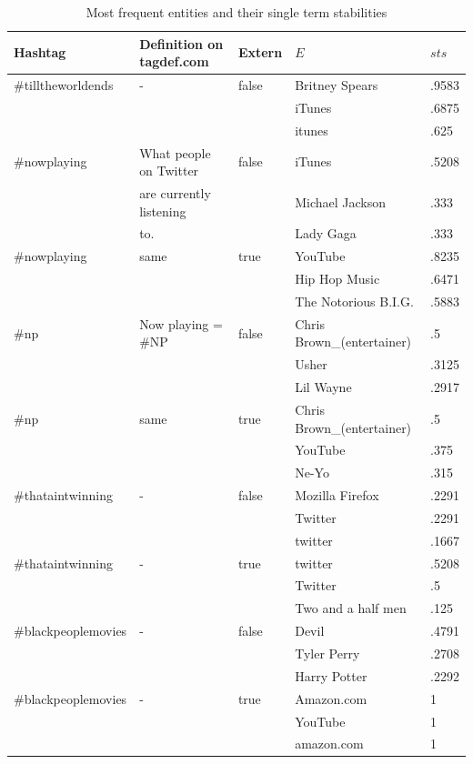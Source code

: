 \documentclass{llncs}
\begin{document}
\begin{table}[ht]
\centering
\small
\begin{tabular}{l|l|l|l|l}
Hashtag & Definition on tagdef.com & Extern & $E$ & $sts$ \\%
\hline
\#tilltheworldends & - & false & Britney Spears & .9583 \\
& & &  iTunes & .6875 \\
& & &  itunes & .625 \\ 
\hline
\#nowplaying & What people on Twitter & false & iTunes & .5208 \\
             & are currently listening & & Michael Jackson & .333 \\
             & to. & & Lady Gaga & .333 \\
\hline
\#nowplaying & same & true & YouTube & .8235 \\
             &  &  & Hip Hop Music & .6471 \\
             &  &  & The Notorious B.I.G. & .5883 \\
\hline
\#np         & Now playing = \#NP & false & Chris Brown\_(entertainer) & .5 \\
& & & Usher & .3125 \\
& & & Lil Wayne & .2917 \\
\hline
\#np & same & true & Chris Brown\_(entertainer) & .5 \\
& & & YouTube & .375 \\
& & & Ne-Yo & .315 \\
\hline
\#thataintwinning & -& false & Mozilla Firefox & .2291 \\
& & & Twitter & .2291 \\
& & & twitter & .1667 \\
\hline
\#thataintwinning & - & true & twitter & .5208 \\
& & & Twitter & .5 \\
& & & Two and a half men & .125 \\
\hline
\#blackpeoplemovies & - & false & Devil & .4791 \\
& & & Tyler Perry & .2708 \\
& & & Harry Potter & .2292 \\
\hline
\#blackpeoplemovies & - & true & Amazon.com & 1 \\
& & & YouTube & 1 \\
& & & amazon.com & 1
\end{tabular}
\label{tbl:entities}
\caption{Most frequent entities and their single term stabilities}
\end{table}
\end{document}
